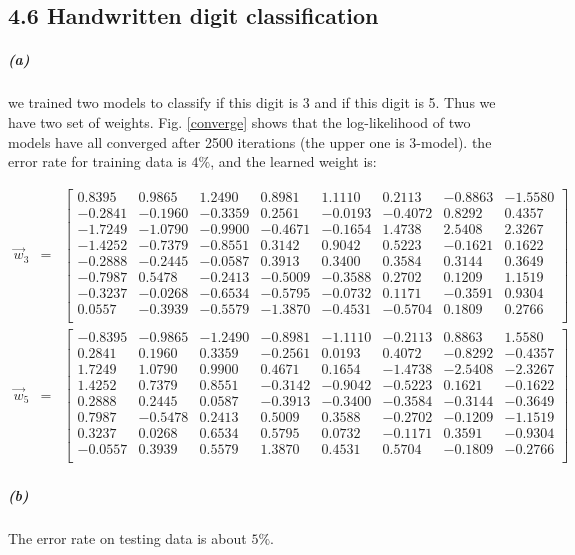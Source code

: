 \documentclass{article}
\begin{document}
\subsection*{4.6 Handwritten digit classification}
\subparagraph*{(a)}
we trained two models to classify if this digit is 3 and if this digit is 5. Thus we have two set of weights. Fig. \ref{converge} shows that the log-likelihood of two models have all converged after 2500 iterations (the upper one is 3-model). the error rate for training data is $4\%$, and the learned weight is:

\begin{eqnarray*}
	\vec{w}_3 &=& \left[ \begin{array}{cccccccc}
		0.8395 & 0.9865 & 1.2490 & 0.8981 & 1.1110 & 0.2113 & -0.8863 & -1.5580 \\
		-0.2841 & -0.1960 & -0.3359 & 0.2561 & -0.0193 & -0.4072 & 0.8292 & 0.4357 \\
		-1.7249 & -1.0790 & -0.9900 & -0.4671 & -0.1654 & 1.4738 & 2.5408 & 2.3267 \\
		-1.4252 & -0.7379 & -0.8551 & 0.3142 & 0.9042 & 0.5223 & -0.1621 & 0.1622 \\
		-0.2888 & -0.2445 & -0.0587 & 0.3913 & 0.3400 & 0.3584 & 0.3144 & 0.3649 \\
		-0.7987 & 0.5478 & -0.2413 & -0.5009 & -0.3588 & 0.2702 & 0.1209 & 1.1519 \\
		-0.3237 & -0.0268 & -0.6534 & -0.5795 & -0.0732 & 0.1171 & -0.3591 & 0.9304 \\
		0.0557 & -0.3939 & -0.5579 & -1.3870 & -0.4531 & -0.5704 & 0.1809 & 0.2766 \\
	\end{array}\right]\\
	\vec{w}_5 &=& \left[ \begin{array}{cccccccc}
		-0.8395 & -0.9865 & -1.2490 & -0.8981 & -1.1110 & -0.2113 & 0.8863 & 1.5580 \\
		0.2841 & 0.1960 & 0.3359 & -0.2561 & 0.0193 & 0.4072 & -0.8292 & -0.4357 \\
		1.7249 & 1.0790 & 0.9900 & 0.4671 & 0.1654 & -1.4738 & -2.5408 & -2.3267 \\
		1.4252 & 0.7379 & 0.8551 & -0.3142 & -0.9042 & -0.5223 & 0.1621 & -0.1622 \\
		0.2888 & 0.2445 & 0.0587 & -0.3913 & -0.3400 & -0.3584 & -0.3144 & -0.3649 \\
		0.7987 & -0.5478 & 0.2413 & 0.5009 & 0.3588 & -0.2702 & -0.1209 & -1.1519 \\
		0.3237 & 0.0268 & 0.6534 & 0.5795 & 0.0732 & -0.1171 & 0.3591 & -0.9304 \\
		-0.0557 & 0.3939 & 0.5579 & 1.3870 & 0.4531 & 0.5704 & -0.1809 & -0.2766 \\
	\end{array}\right]
\end{eqnarray*}



\subparagraph*{(b)}
The error rate on testing data is about $5\%$.
\end{document}
